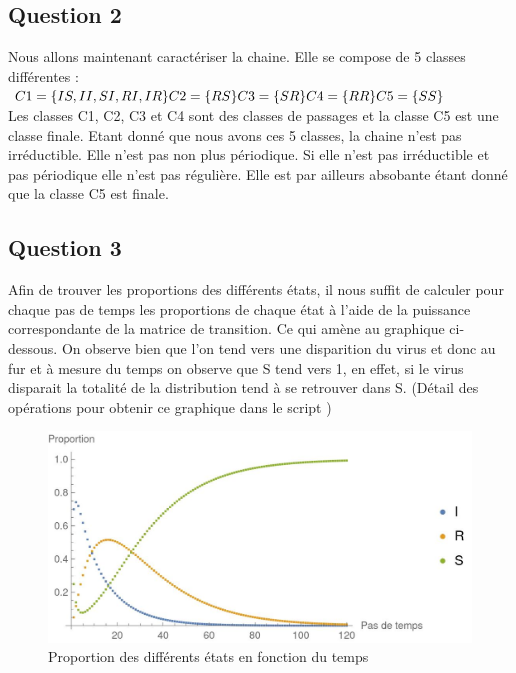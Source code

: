 \documentclass[a4paper, 11pt, oneside]{article}
\begin{document}
\subsection{Question 2}

Nous allons maintenant caractériser la chaine. 
Elle se compose de 5 classes différentes :
$C1 = \{IS, II, SI, RI, IR\}
\\C2 = \{RS\}
\\C3 = \{SR\}
\\C4 = \{RR\}
\\C5 = \{SS\}$
\\Les classes C1, C2, C3 et C4 sont des classes de passages 
et la classe C5 est une classe finale.
Etant donné que nous avons ces 5 classes, la chaine n'est pas irréductible.
Elle n'est pas non plus périodique. Si elle n'est pas irréductible et pas périodique 
elle n'est pas régulière. Elle est par ailleurs absobante étant donné que la classe 
C5 est finale.

\subsection{Question 3}

Afin de trouver les proportions des différents états, il nous suffit de 
calculer pour chaque pas de temps les proportions de chaque état à l'aide de 
la puissance correspondante de la matrice de transition. Ce qui amène au graphique 
ci-dessous. On observe bien que l'on tend vers une disparition du virus et donc 
au fur et à mesure du temps on observe que S tend vers 1, en effet, si 
le virus disparait la totalité de la distribution tend à se retrouver dans S.
(Détail des opérations pour obtenir ce graphique dans le script )

\begin{figure}[h]
    \centering
    \includegraphics[scale=0.95]{graphiqueSIR.jpg}
    \caption{Proportion des différents états en fonction du temps}
\end{figure}
\end{document}
